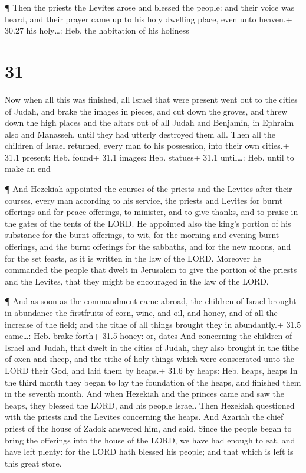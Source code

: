  ¶ Then the priests the Levites arose and blessed the
people: and their voice was heard, and their prayer came up to his holy
dwelling place, even unto heaven.+ 30.27 his holy\ldots: Heb. the
habitation of his holiness

\hypertarget{section-30}{%
\section{31}\label{section-30}}

 Now when all this was finished, all Israel that were
present went out to the cities of Judah, and brake the images in pieces,
and cut down the groves, and threw down the high places and the altars
out of all Judah and Benjamin, in Ephraim also and Manasseh, until they
had utterly destroyed them all. Then all the children of Israel
returned, every man to his possession, into their own cities.+ 31.1
present: Heb. found+ 31.1 images: Heb. statues+ 31.1 until\ldots: Heb.
until to make an end

 ¶ And Hezekiah appointed the courses of the priests and the
Levites after their courses, every man according to his service, the
priests and Levites for burnt offerings and for peace offerings, to
minister, and to give thanks, and to praise in the gates of the tents of
the LORD.  He appointed also the king's portion of his
substance for the burnt offerings, to wit, for the morning and evening
burnt offerings, and the burnt offerings for the sabbaths, and for the
new moons, and for the set feasts, as it is written in the law of the
LORD.  Moreover he commanded the people that dwelt in
Jerusalem to give the portion of the priests and the Levites, that they
might be encouraged in the law of the LORD.

 ¶ And as soon as the commandment came abroad, the children
of Israel brought in abundance the firstfruits of corn, wine, and oil,
and honey, and of all the increase of the field; and the tithe of all
things brought they in abundantly.+ 31.5 came\ldots: Heb. brake forth+
31.5 honey: or, dates  And concerning the children of Israel
and Judah, that dwelt in the cities of Judah, they also brought in the
tithe of oxen and sheep, and the tithe of holy things which were
consecrated unto the LORD their God, and laid them by heaps.+ 31.6 by
heaps: Heb. heaps, heaps  In the third month they began to
lay the foundation of the heaps, and finished them in the seventh month.
 And when Hezekiah and the princes came and saw the heaps,
they blessed the LORD, and his people Israel.  Then Hezekiah
questioned with the priests and the Levites concerning the heaps.
 And Azariah the chief priest of the house of Zadok
answered him, and said, Since the people began to bring the offerings
into the house of the LORD, we have had enough to eat, and have left
plenty: for the LORD hath blessed his people; and that which is left is
this great store.

